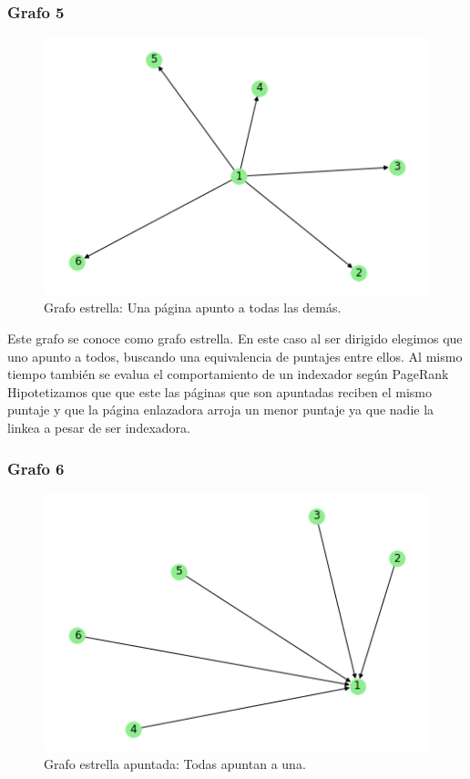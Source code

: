 \subsubsection{Grafo 5}

\begin{figure}[H]
   \begin{center}
     \includegraphics{img/prueba_estrella.png} 
  \end{center}
\caption{Grafo estrella: Una página apunto a todas las demás.} \label{fig:exp3-estrella}
\end{figure}

Este grafo se conoce como grafo estrella. En este caso al ser dirigido elegimos que uno apunto a todos, buscando una equivalencia de puntajes entre ellos. Al mismo tiempo también se evalua el comportamiento de un indexador según PageRank\\

Hipotetizamos que que este las páginas que son apuntadas reciben el mismo puntaje y que la página enlazadora arroja un menor puntaje ya que nadie la linkea a pesar de ser indexadora. \\

\subsubsection{Grafo 6}

\begin{figure}[H]
   \begin{center}
     \includegraphics{img/prueba_estrella_apuntada.png} 
  \end{center}
\caption{Grafo estrella apuntada: Todas apuntan a una.} \label{fig:exp3-estrella}
\end{figure}


